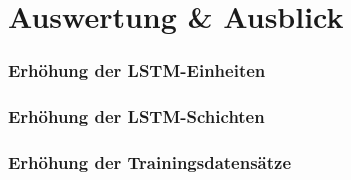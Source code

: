 \chapter{Auswertung \& Ausblick}
\label{ch:analysis}

\subsection{Erhöhung der LSTM-Einheiten}
\label{subsec:increase-lstm}

\subsection{Erhöhung der LSTM-Schichten}
\label{subsec:increase-lstm-layers}

\subsection{Erhöhung der Trainingsdatensätze}
\label{subsec:increase-num-dataset}

